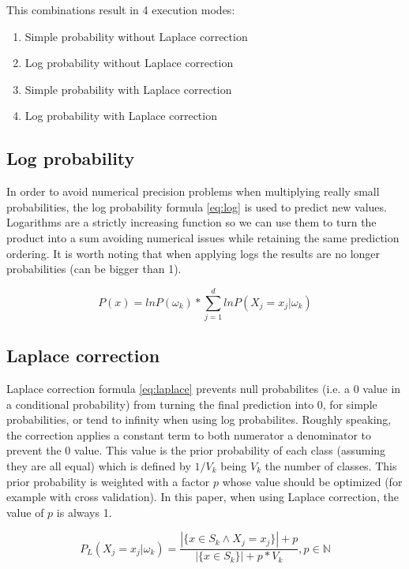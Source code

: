 \documentclass[a4paper,10pt]{article}
\begin{document}
This combinations result in 4 execution modes:

\begin{enumerate}
  \item Simple probability without Laplace correction
  \item Log probability without Laplace correction
  \item Simple probability with Laplace correction
  \item Log probability with Laplace correction
\end{enumerate}


\subsection{Log probability}

In order to avoid numerical precision problems when multiplying really small probabilities, the log probability formula \ref{eq:log} is used to predict new values. Logarithms are a strictly increasing function so we can use them to turn the product into a sum avoiding numerical issues while retaining the same prediction ordering. It is worth noting that when applying logs the results are no longer probabilities (can be bigger than 1).

\begin{equation} \label{eq:log}
 P(x) = ln P(\omega_k) * \sum_{j=1}^d ln P(X_j=x_j|\omega_k)
\end{equation}


\subsection{Laplace correction}
\label{subsec:laplace}
Laplace correction formula \ref{eq:laplace} prevents null probabilites (i.e. a 0 value in a conditional probability) from turning the final prediction into 0, for simple probabilities, or tend to infinity when using log probabilites. Roughly speaking, the correction applies a constant term to both numerator a denominator to prevent the 0 value. This value is the prior probability of each class (assuming they are all equal) which is defined by $1/V_k$ being $V_k$ the number of classes. This prior probability is weighted with a factor $p$ whose value should be optimized (for example with cross validation). In this paper, when using Laplace correction, the value of $p$ is always 1.

\begin{equation} \label{eq:laplace}
 P_L(X_j = x_j | \omega_k ) = \frac{ | \{ x \in S_k \land X_j = x_j \} | + p }{ | \{ x \in S_k \} | + p*V_k}, p \in \mathbb {N} 
\end{equation}
\end{document}
